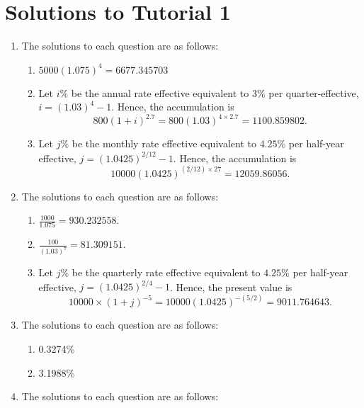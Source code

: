 \documentclass[
]{article}
\providecommand{\tightlist}{%
  \setlength{\itemsep}{0pt}\setlength{\parskip}{0pt}}
\theoremstyle{definition}
\theoremstyle{definition}
\theoremstyle{definition}
\theoremstyle{definition}
\theoremstyle{remark}
\begin{document}
\hypertarget{solutions-to-tutorial-1}{%
\section{Solutions to Tutorial 1}\label{solutions-to-tutorial-1}}

\begin{enumerate}
\def\labelenumi{\arabic{enumi}.}
\item
  The solutions to each question are as follows:

  \begin{enumerate}
  \def\labelenumii{\arabic{enumii}.}
  \tightlist
  \item
    \(5000 (1.075)^4 = 6677.345703\)
  \item
    Let \(i\%\) be the annual rate effective equivalent to \(3\%\) per quarter-effective, \(i = (1.03)^4 - 1\).
    Hence, the accumulation is
    \[800(1+i)^{2.7} = 800(1.03)^{4\times2.7} = 1100.859802.\]
  \item
    Let \(j\%\) be the monthly rate effective equivalent to \(4.25\%\) per half-year effective, \(j = (1.0425)^{2/12} - 1\).
    Hence, the accumulation is
    \[10000(1.0425)^{(2/12)\times27} = 12059.86056.\]
  \end{enumerate}
\item
  The solutions to each question are as follows:

  \begin{enumerate}
  \def\labelenumii{\arabic{enumii}.}
  \tightlist
  \item
    \(\frac{1000}{1.075} = 930.232558\).
  \item
    \(\frac{100}{(1.03)^7} = 81.309151\).
  \item
    Let \(j\%\) be the quarterly rate effective equivalent to \(4.25\%\) per half-year effective, \(j = (1.0425)^{2/4} - 1\).
    Hence, the present value is
    \[10000\times (1+j)^{-5} = 10000(1.0425)^{-(5/2)} = 9011.764643.\]
  \end{enumerate}
\item
  The solutions to each question are as follows:

  \begin{enumerate}
  \def\labelenumii{\arabic{enumii}.}
  \tightlist
  \item
    0.3274\%
  \item
    3.1988\%
  \end{enumerate}
\item
  The solutions to each question are as follows:


\end{enumerate}
\end{document}
